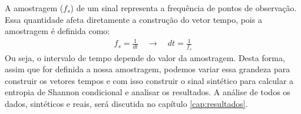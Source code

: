 A amostragem ($f_s$) de um sinal representa a frequência de pontos de observação. Essa quantidade afeta diretamente a construção do vetor tempo, pois a amostragem é definida como:
\begin{align}
f_s = \frac{1}{dt} \quad \to \quad dt = \frac{1}{f_s} \label{eq:amostragem}
\end{align}
Ou seja, o intervalo de tempo depende do valor da amostragem. Desta forma, assim que for definida a nossa amostragem, podemos variar essa grandeza para construir os vetores tempos e com isso construir o sinal sintético para calcular a entropia de Shannon condicional e analisar os resultados. A análise de todos os dados, sintéticos e reais, será discutida no capítulo \ref{cap:resultados}.
